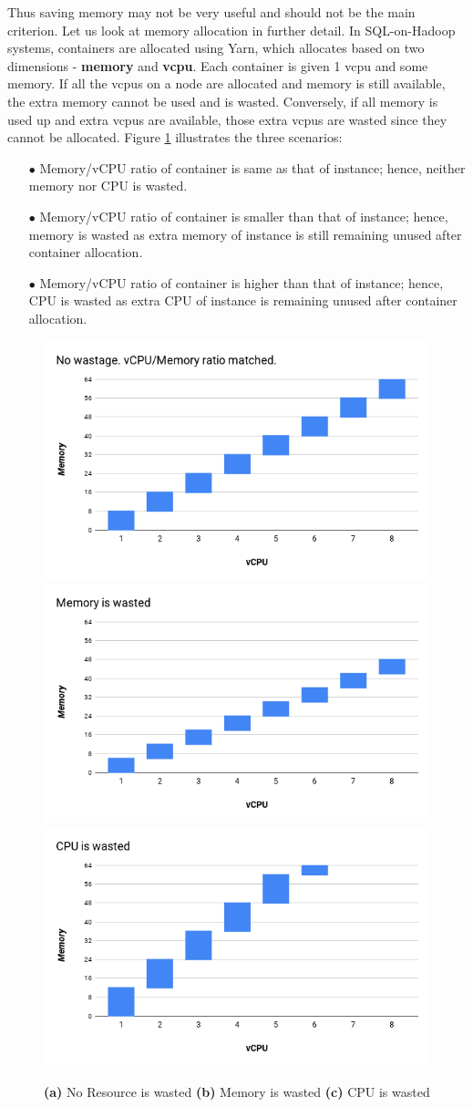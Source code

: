 Thus saving memory may not be very useful and should not be the main criterion. Let us look at memory allocation in further detail. In SQL-on-Hadoop systems, containers are allocated using Yarn, which allocates based on two dimensions - \textbf{memory} and \textbf{vcpu}. Each container is given 1 vcpu and some memory. If all the vcpus on a node are allocated and memory is still available, the extra memory cannot be used and is wasted. Conversely, if all memory is used up and extra vcpus are available, those extra vcpus are wasted since they cannot be allocated. 
Figure \ref{fig:container_shape} illustrates the three scenarios:
\begin{enumerate}[label=(\alph*)]
	\item[$\bullet$] Memory/vCPU ratio of container is same as that of instance; hence, neither memory nor CPU is wasted. 
	\item[$\bullet$] Memory/vCPU ratio of container is smaller than that of instance; hence, memory is wasted as extra memory of instance is still remaining unused after container allocation.
	\item[$\bullet$] Memory/vCPU ratio of container is higher than that of instance; hence, CPU is wasted as extra CPU of instance is remaining unused after container allocation.
\end{enumerate}
\begin{figure}[h]
	\includegraphics[width=0.32\linewidth]{container_shape1.png} 
	\includegraphics[width=0.32\linewidth]{container_shape2.png}
	\includegraphics[width=0.32\linewidth]{container_shape3.png}
	\caption{\textbf{(a)} No Resource is wasted \textbf{(b)} Memory is wasted \textbf{(c)} CPU is wasted}
	\label{fig:container_shape}
\end{figure}

